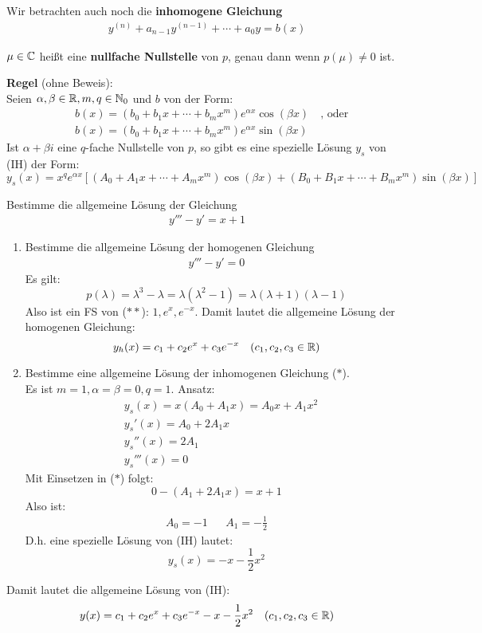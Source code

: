 \documentclass[a4paper,twoside,DIV15,BCOR12mm,chapterprefix=true,headings=twolinechapter]{scrbook}
\begin{document}
Wir betrachten auch noch die \textbf{inhomogene Gleichung}
\begin{align*}
\tag{IH} y^{(n)}+a_{n-1}y^{(n-1)}+\cdots+a_0y=b(x)
\end{align*}

\begin{definition}
$\mu\in\mathbb{C}$ heißt eine \textbf{nullfache Nullstelle} von $p$, genau dann wenn
$p(\mu)\ne 0$ ist.
\end{definition}

\textbf{Regel} (ohne Beweis):\\
Seien $\alpha,\beta\in\mathbb{R},m,q\in\mathbb{N}_0$ und $b$ von der Form:
\begin{align*}
&b(x)=(b_0+b_1x+\cdots+b_mx^m)e^{\alpha x}\cos(\beta x)\quad\text{, oder}\\
&b(x)=(b_0+b_1x+\cdots+b_mx^m)e^{\alpha x}\sin(\beta x)
\end{align*}
Ist $\alpha+\beta i$ eine $q$-fache Nullstelle von $p$, so gibt es eine spezielle Lösung
$y_s$ von (IH) der Form:
\[y_s(x)=x^qe^{\alpha x}\left[(A_0+A_1x+\cdots+A_mx^m)\cos(\beta x)+(B_0+B_1x+\cdots+B_mx^m)\sin(\beta x)\right]\]

\begin{beispiel}
Bestimme die allgemeine Lösung der Gleichung
\begin{align*}
y'''-y'=x+1\tag{$*$}
\end{align*}
\begin{enumerate}
\item Bestimme die allgemeine Lösung der homogenen Gleichung
\begin{align*}
y'''-y'=0\tag{$**$}
\end{align*}
Es gilt:
\[p(\lambda)=\lambda^3-\lambda=\lambda(\lambda^2-1)=\lambda(\lambda+1)(\lambda-1)\]
Also ist ein FS von ($**$): $1,e^x,e^{-x}$. Damit lautet die allgemeine Lösung der homogenen
Gleichung:
\[y_h(x)=c_1+c_2e^x+c_3e^{-x}\quad(c_1,c_2,c_3\in\mathbb{R})\]
\item Bestimme eine allgemeine Lösung der inhomogenen Gleichung ($*$).\\ 
Es ist $m=1,\alpha=\beta=0,q=1$. Ansatz:
\begin{align*}
&y_s(x)=x(A_0+A_1x)=A_0x+A_1x^2\\
&y_s'(x)=A_0+2A_1x\\
&y_s''(x)=2A_1\\
&y_s'''(x)=0
\end{align*}
Mit Einsetzen in ($*$) folgt:
\[0-(A_1+2A_1x)=x+1\]
Also ist:
\begin{align*}
A_0=-1&&A_1=-\frac12
\end{align*}
D.h. eine spezielle Lösung von (IH) lautet:
\[y_s(x)=-x-\frac12 x^2\]
\end{enumerate}
Damit lautet die allgemeine Lösung von (IH):
\[y(x)=c_1+c_2e^x+c_3e^{-x}-x-\frac12 x^2\quad(c_1,c_2,c_3\in\mathbb{R})\]
\end{beispiel}
\end{document}
